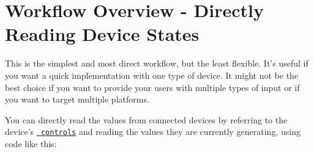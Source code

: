 \chapter{Workflow Overview -\/ Directly Reading Device States}
\hypertarget{md__hey_tea_9_2_library_2_package_cache_2com_8unity_8inputsystem_0d1_86_83_2_documentation_0i_2_workflow-_direct}{}\label{md__hey_tea_9_2_library_2_package_cache_2com_8unity_8inputsystem_0d1_86_83_2_documentation_0i_2_workflow-_direct}
\label{md__hey_tea_9_2_library_2_package_cache_2com_8unity_8inputsystem_0d1_86_83_2_documentation_0i_2_workflow-_direct_autotoc_md1609}%
%
 

This is the simplest and most direct workflow, but the least flexible. It’s useful if you want a quick implementation with one type of device. It might not be the best choice if you want to provide your users with multiple types of input or if you want to target multiple platforms.

You can directly read the values from connected devices by referring to the device’s \href{Controls.html}{\texttt{ controls}} and reading the values they are currently generating, using code like this\+:


\begin{DoxyCode}{0}
\DoxyCodeLine{\{}
\DoxyCodeLine{\ \ \ \ \{}
\DoxyCodeLine{\ \ \ \ \ \ \ \ \{}
\DoxyCodeLine{\ \ \ \ \ \ \ \ \}}
\DoxyCodeLine{}
\DoxyCodeLine{\ \ \ \ \ \ \ \ \{}
\DoxyCodeLine{\ \ \ \ \ \ \ \ \}}
\DoxyCodeLine{}
\DoxyCodeLine{\ \ \ \ \ \ \ \ \{}
\DoxyCodeLine{\ \ \ \ \ \ \ \ \}}
\DoxyCodeLine{\ \ \ \ \}}
\DoxyCodeLine{\}}

\end{DoxyCode}



